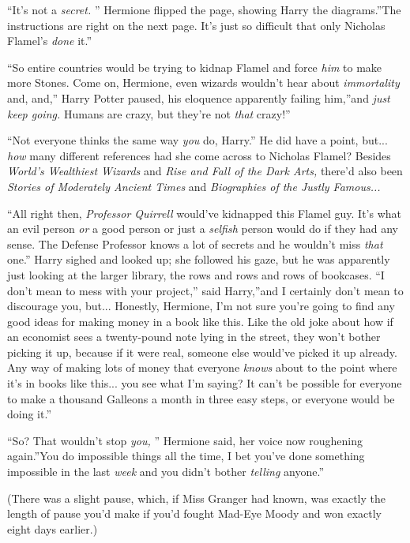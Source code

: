 ``It's not a \emph{secret.} '' Hermione flipped the page, showing Harry
the diagrams.''The instructions are right on the next page. It's just so
difficult that only Nicholas Flamel's \emph{done} it.''

``So entire countries would be trying to kidnap Flamel and force
\emph{him} to make more Stones. Come on, Hermione, even wizards wouldn't
hear about \emph{immortality} and, and,'' Harry Potter paused, his
eloquence apparently failing him,''and \emph{just keep going.} Humans
are crazy, but they're not \emph{that} crazy!''

``Not everyone thinks the same way \emph{you} do, Harry.'' He did have a
point, but... \emph{how} many different references had she come
across to Nicholas Flamel? Besides \emph{World's Wealthiest Wizards} and
\emph{Rise and Fall of the Dark Arts,} there'd also been \emph{Stories
of Moderately Ancient Times} and \emph{Biographies of the Justly
Famous...}

``All right then, \emph{Professor Quirrell} would've kidnapped this
Flamel guy. It's what an evil person \emph{or} a good person or just a
\emph{selfish} person would do if they had any sense. The Defense
Professor knows a lot of secrets and he wouldn't miss \emph{that} one.''
Harry sighed and looked up; she followed his gaze, but he was apparently
just looking at the larger library, the rows and rows and rows of
bookcases. ``I don't mean to mess with your project,'' said Harry,''and
I certainly don't mean to discourage you, but... Honestly,
Hermione, I'm not sure you're going to find any good ideas for making
money in a book like this. Like the old joke about how if an economist
sees a twenty-pound note lying in the street, they won't bother picking
it up, because if it were real, someone else would've picked it up
already. Any way of making lots of money that everyone \emph{knows}
about to the point where it's in books like this... you see what
I'm saying? It can't be possible for everyone to make a thousand
Galleons a month in three easy steps, or everyone would be doing it.''

``So? That wouldn't stop \emph{you,} '' Hermione said, her voice now
roughening again.''You do impossible things all the time, I bet you've
done something impossible in the last \emph{week} and you didn't bother
\emph{telling} anyone.''

(There was a slight pause, which, if Miss Granger had known, was exactly
the length of pause you'd make if you'd fought Mad-Eye Moody and won
exactly eight days earlier.)


